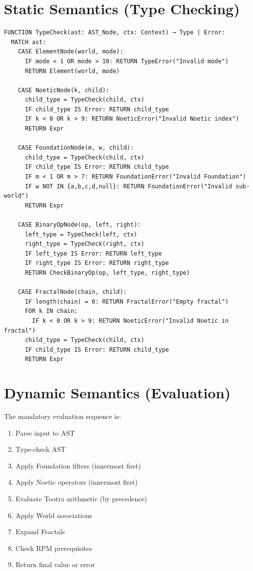 \section{Static Semantics (Type Checking)}

\begin{definition}
\label{def:typecheck}
\begin{verbatim}
FUNCTION TypeCheck(ast: AST_Node, ctx: Context) → Type | Error:
  MATCH ast:
    CASE ElementNode(world, mode):
      IF mode < 1 OR mode > 10: RETURN TypeError("Invalid mode")
      RETURN Element(world, mode)

    CASE NoeticNode(k, child):
      child_type = TypeCheck(child, ctx)
      IF child_type IS Error: RETURN child_type
      IF k < 0 OR k > 9: RETURN NoeticError("Invalid Noetic index")
      RETURN Expr

    CASE FoundationNode(m, w, child):
      child_type = TypeCheck(child, ctx)
      IF child_type IS Error: RETURN child_type
      IF m < 1 OR m > 7: RETURN FoundationError("Invalid Foundation")
      IF w NOT IN {a,b,c,d,null}: RETURN FoundationError("Invalid sub-world")
      RETURN Expr

    CASE BinaryOpNode(op, left, right):
      left_type = TypeCheck(left, ctx)
      right_type = TypeCheck(right, ctx)
      IF left_type IS Error: RETURN left_type
      IF right_type IS Error: RETURN right_type
      RETURN CheckBinaryOp(op, left_type, right_type)

    CASE FractalNode(chain, child):
      IF length(chain) = 0: RETURN FractalError("Empty fractal")
      FOR k IN chain:
        IF k < 0 OR k > 9: RETURN NoeticError("Invalid Noetic in fractal")
      child_type = TypeCheck(child, ctx)
      IF child_type IS Error: RETURN child_type
      RETURN Expr
\end{verbatim}
\end{definition}

\section{Dynamic Semantics (Evaluation)}

\begin{definition}
\label{def:eval-order}
The mandatory evaluation sequence is:
\begin{enumerate}
  \item Parse input to AST
  \item Type-check AST
  \item Apply Foundation filters (innermost first)
  \item Apply Noetic operators (innermost first)
  \item Evaluate Tootra arithmetic (by precedence)
  \item Apply World associations
  \item Expand Fractals
  \item Check RPM prerequisites
  \item Return final value or error
\end{enumerate}
\end{definition}

